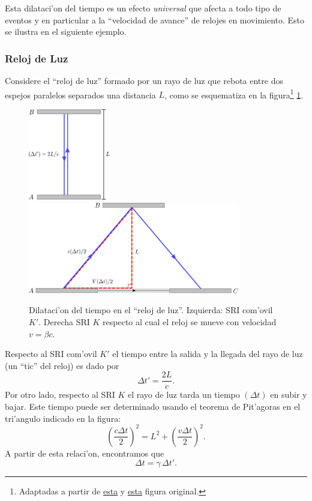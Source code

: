 Esta dilataci'on del tiempo es un efecto \textit{universal} que afecta a todo tipo de eventos y en particular a la ``velocidad de avance'' de relojes en movimiento. Esto se ilustra en el siguiente ejemplo.

\subsubsection{Reloj de Luz}
Considere el ``reloj de luz'' formado por un rayo de luz que rebota entre dos espejos paralelos separados una distancia $L$, como se esquematiza en la figura\footnote{Adaptadas a partir de \href{http://en.wikipedia.org/wiki/File:Time-dilation-001.svg}{esta} y \href{http://en.wikipedia.org/wiki/File:Time-dilation-002.svg}{esta} figura original.} \ref{dt}.
\begin{figure}[!h]
\centerline{\includegraphics[height= 4cm]{fig/fig-diagrama-dilatacion-01.pdf}\hspace{1cm}
\includegraphics[height=4cm]{fig/fig-diagrama-dilatacion-02.pdf}}
 \caption{Dilataci'on del tiempo en el ``reloj de luz''. Izquierda: SRI com'ovil $K'$. Derecha SRI $K$ respecto al cual el reloj se mueve con velocidad $v=\beta c$.}
\label{dt}
\end{figure}
Respecto al SRI com'ovil $K'$ el tiempo entre la salida y la llegada del rayo de luz (un ``tic'' del reloj) es dado por
\begin{equation}
\Delta t'=\frac{2L}{c}.
\end{equation}
Por otro lado, respecto al SRI $K$ el rayo de luz tarda un tiempo $(\Delta t)$ en subir y bajar. Este tiempo puede ser determinado usando el teorema de Pit'agoras en el tri'angulo indicado en la figura:	
\begin{equation}
\left(\frac{c\Delta t}{2}\right)^2=L^2+\left(\frac{v\Delta t}{2}\right)^2.
\end{equation}
A partir de esta relaci'on, encontramos que
\begin{equation}
\Delta t=\gamma\,\Delta t'.
\end{equation}

